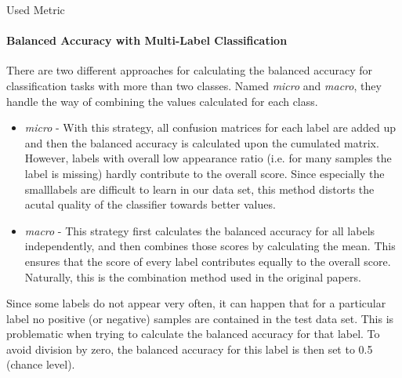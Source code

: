 \begin{subsection}{Used Metric}
		\paragraph{Balanced Accuracy with Multi-Label Classification}
		There are two different approaches for calculating the balanced accuracy for classification tasks with more than two classes. Named \emph{micro} and \emph{macro}, they handle the way of combining the values calculated for each class.
		\begin{itemize}
			\item \emph{micro} - With this strategy, all confusion matrices for each label are added up and then the balanced accuracy is calculated upon the cumulated matrix. However, labels with overall low appearance ratio (i.e. for many samples the label is missing) hardly contribute to the overall score. Since especially the \glqq small\grqq labels are difficult to learn in our data set, this method distorts the acutal quality of the classifier towards better values.
			\item \emph{macro} - This strategy first calculates the balanced accuracy for all labels independently, and then combines those scores by calculating the mean. This ensures that the score of every label contributes equally to the overall score. Naturally, this is the combination method used in the original papers.
		\end{itemize}
		Since some labels do not appear very often, it can happen that for a particular label no positive (or negative) samples are contained in the test data set. This is problematic when trying to calculate the balanced accuracy for that label. To avoid division by zero, the balanced accuracy for this label is then set to 0.5 (chance level).
		

	\end{subsection}